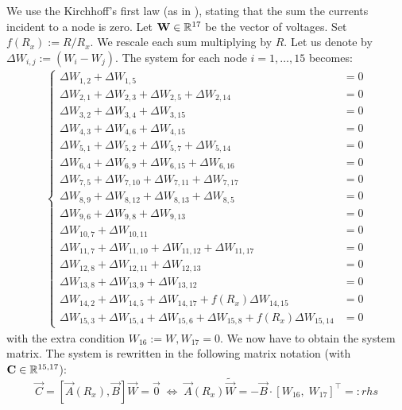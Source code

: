 \begin{problem}
\begin{subproblem}[3]
  \begin{solution}
   We use the Kirchhoff's first law (as in ), stating that the sum the currents incident to a node is zero. Let $\mathbf{W} \in \mathbb{R}^{17}$ be the vector of voltages. Set $f(R_x) := R / R_x$. We rescale each sum multiplying by $R$. Let us denote by $\Delta W_{i,j} := (W_i - W_j)$. The system  for each node $i = 1,\dots,15$ becomes: 
   \begin{align} \label{eq:syst_impedance}
   \begin{cases} 
    \Delta W_{1,2} + \Delta W_{1,5} & = 0 \\
    \Delta W_{2,1} + \Delta W_{2,3} + \Delta W_{2,5} + \Delta W_{2,14} & = 0 \\
    \Delta W_{3,2} + \Delta W_{3,4} + \Delta W_{3,15} & = 0 \\
    \Delta W_{4,3} + \Delta W_{4,6} + \Delta W_{4,15} & = 0 \\
    \Delta W_{5,1} + \Delta W_{5,2} + \Delta W_{5,7} + \Delta W_{5,14} & = 0 \\
    \Delta W_{6,4} + \Delta W_{6,9} + \Delta W_{6,15} + \Delta W_{6,16} & = 0 \\
    \Delta W_{7,5} + \Delta W_{7,10} + \Delta W_{7,11} + \Delta W_{7,17} & = 0 \\
    \Delta W_{8,9} + \Delta W_{8,12} + \Delta W_{8,13} + \Delta W_{8,5} & = 0 \\
    \Delta W_{9,6} + \Delta W_{9,8} + \Delta W_{9,13} & = 0 \\
    \Delta W_{10,7} + \Delta W_{10,11} & = 0 \\
    \Delta W_{11,7} + \Delta W_{11,10} + \Delta W_{11,12} + \Delta W_{11,17} & = 0 \\
    \Delta W_{12,8} + \Delta W_{12,11} + \Delta W_{12,13} & = 0 \\
    \Delta W_{13,8} + \Delta W_{13,9} + \Delta W_{13,12} & = 0 \\
    \Delta W_{14,2} + \Delta W_{14,5} + \Delta W_{14,17} + f(R_x) \Delta W_{14,15} & = 0 \\
    \Delta W_{15,3} + \Delta W_{15,4} + \Delta W_{15,6} + \Delta W_{15,8} + f(R_x) \Delta W_{15,14} & = 0
   \end{cases}
   \end{align}
   with the extra condition $W_{16} := W, W_{17} = 0$. We now have to obtain the system matrix. The system is rewritten in the following matrix notation (with $\mathbf{C} \in \mathbb{R}^{15,17}$):
   \[
    \vec{C} = [\vec{A}(R_x), \vec{B}] \vec{W} = \vec{0} \; \Leftrightarrow \; \vec{A}(R_x) \tilde{\vec{W}} = - \vec{B} \cdot [W_{16}, \; W_{17}]^\top =: rhs
\]
\end{solution}
\end{subproblem}
\end{problem}
